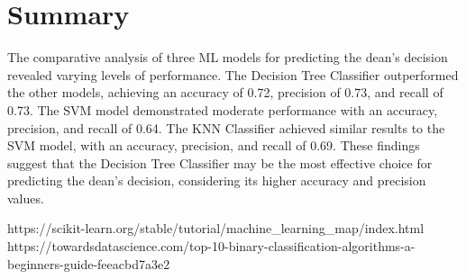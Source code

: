 \documentclass[conference]{IEEEtran}
\begin{document}
\section{Summary}
The comparative analysis of three ML models for predicting the dean's decision revealed varying levels of performance. The Decision Tree Classifier outperformed the other models, achieving an accuracy of 0.72, precision of 0.73, and recall of 0.73. The SVM model demonstrated moderate performance with an accuracy, precision, and recall of 0.64. The KNN Classifier achieved similar results to the SVM model, with an accuracy, precision, and recall of 0.69. These findings suggest that the Decision Tree Classifier may be the most effective choice for predicting the dean's decision, considering its higher accuracy and precision values.

\begin{thebibliography}{00}
 https://scikit-learn.org/stable/tutorial/machine\_learning\_map/index.html
 https://towardsdatascience.com/top-10-binary-classification-algorithms-a-beginners-guide-feeacbd7a3e2

\end{thebibliography}
\end{document}
